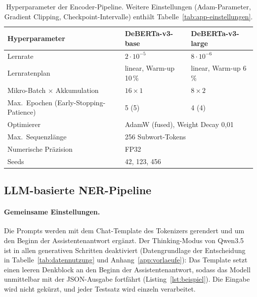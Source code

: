 \begin{table}[ht]
  \centering
  \small
  \caption[Hyperparameter der Encoder-Pipeline]{Hyperparameter der Encoder-Pipeline.
  Weitere Einstellungen (Adam-Parameter, Gradient Clipping,
  Checkpoint-Intervalle) enthält Tabelle~\ref{tab:app-einstellungen}.}
  \label{tab:encoder-hyperparams}
  \begin{tabular}{lll}
    \toprule
    \textbf{Hyperparameter} & \textbf{DeBERTa-v3-base} &
    \textbf{DeBERTa-v3-large} \\
    \midrule
    Lernrate & $2 \cdot 10^{-5}$ & $8 \cdot 10^{-6}$ \\
    Lernratenplan & linear, Warm-up 10\,\% & linear, Warm-up 6\,\% \\
    Mikro-Batch $\times$ Akkumulation & $16 \times 1$ & $8 \times 2$ \\
    Max.\ Epochen (Early-Stopping-Patience) & 5 (5) & 4 (4) \\
    Optimierer & \multicolumn{2}{l}{AdamW (fused), Weight Decay 0,01} \\
    Max.\ Sequenzlänge & \multicolumn{2}{l}{256 Subwort-Tokens} \\
    Numerische Präzision & \multicolumn{2}{l}{FP32} \\
    Seeds & \multicolumn{2}{l}{42, 123, 456} \\
    \bottomrule
  \end{tabular}
\end{table}

\subsection{LLM-basierte NER-Pipeline}
\label{sec:llm-pipeline}

\paragraph{Gemeinsame Einstellungen.}
Die Prompts werden mit dem Chat-Template des Tokenizers gerendert und um
den Beginn der Assistentenantwort ergänzt.
Der Thinking-Modus von Qwen3.5 ist in allen generativen Schritten
deaktiviert (Datengrundlage der Entscheidung in
Tabelle~\ref{tab:datennutzung} und Anhang~\ref{app:vorlaeufe}): Das
Template setzt einen leeren Denkblock an den Beginn der
Assistentenantwort, sodass das Modell unmittelbar mit der JSON-Ausgabe
fortfährt (Listing~\ref{lst:beispiel}).
Die Eingabe wird nicht gekürzt, und jeder Testsatz wird einzeln
verarbeitet.

